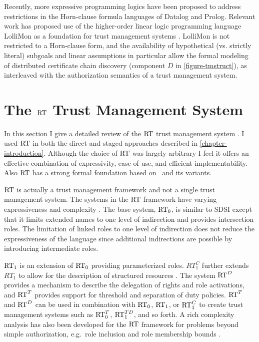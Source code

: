 Recently, more expressive programming logics have been proposed to address restrictions in the
Horn-clause formula languages of Datalog and Prolog. Relevant work has proposed use of the
higher-order linear logic programming language LolliMon as a foundation for trust management
systems \cite{polakow-skalka-plas06}. LolliMon is not restricted to a Horn-clause form, and the
availability of hypothetical (vs. strictly literal) subgoals and linear assumptions in
particular allow the formal modeling of distributed certificate chain discovery (component $D$
in \autoref{figure-tmstruct}), as interleaved with the authorization semantics of a trust
management system.

\section{The $\text{RT}$ Trust Management System}
\label{section-rt}

In this section I give a detailed review of the $\text{RT}$ trust management system \cite{Li:DRBTMF}.
I used $\text{RT}$ in both the direct and staged approaches described in
\autoref{chapter-introduction}. Although the choice of $\text{RT}$ was largely arbitrary I feel it
offers an effective combination of expressivity, ease of use, and efficient implementability.
Also $\text{RT}$ has a strong formal foundation based on \datalog\ and its variants.

$\text{RT}$ is actually a trust management framework and not a single trust management system. The
systems in the $\text{RT}$ framework have varying expressiveness and complexity
\cite{Li:DRBTMF,Li:DCDTM,Li:RRBTMF}. The base system, $\text{RT}_0$, is similar to SDSI except that it
limits extended names to one level of indirection and provides intersection roles. The
limitation of linked roles to one level of indirection does not reduce the expressiveness of the
language since additional indirections are possible by introducing intermediate roles.

$\text{RT}_1$ is an extension of $\text{RT}_0$ providing parameterized roles. $RT_1^C$ further extends
$RT_1$ to allow for the description of structured resources \cite{Li:DCFTML,Li:RRBTMF}. The
system $\text{RT}^D$ provides a mechanism to describe the delegation of rights and role activations,
and $\text{RT}^T$ provides support for threshold and separation of duty policies. $\text{RT}^T$ and $\text{RT}^D$
can be used in combination with $\text{RT}_0$, $\text{RT}_1$, or $\text{RT}_1^C$ to create trust management
systems such as $\text{RT}_0^T$, $\text{RT}_1^{TD}$, and so forth. A rich complexity analysis has also been
developed for the $\text{RT}$ framework for problems beyond simple authorization, e.g.~role inclusion
and role membership bounds \cite{Li:BPOCSATM}.

